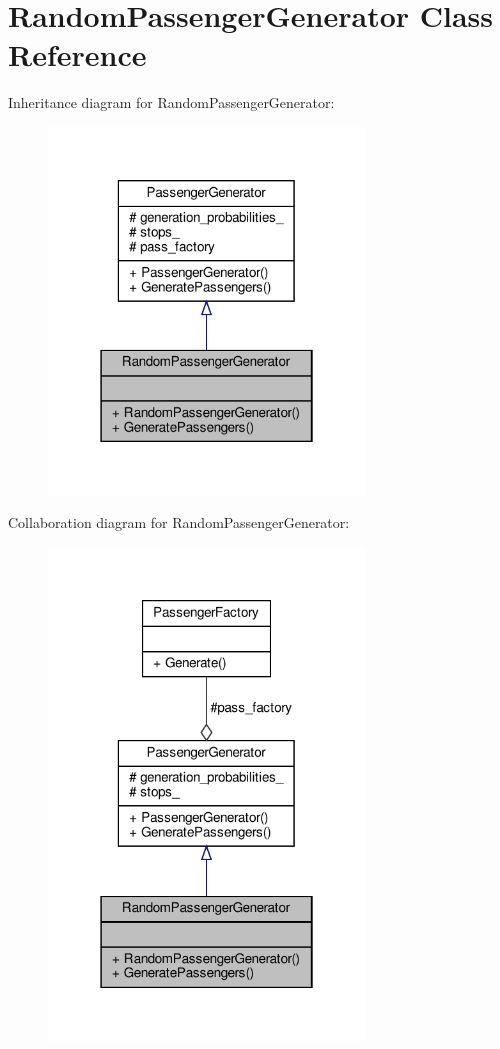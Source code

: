 \hypertarget{classRandomPassengerGenerator}{}\section{Random\+Passenger\+Generator Class Reference}
\label{classRandomPassengerGenerator}


Inheritance diagram for Random\+Passenger\+Generator\+:
\nopagebreak
\begin{figure}[H]
\begin{center}
\leavevmode
\includegraphics[width=238pt]{classRandomPassengerGenerator__inherit__graph}
\end{center}
\end{figure}


Collaboration diagram for Random\+Passenger\+Generator\+:
\nopagebreak
\begin{figure}[H]
\begin{center}
\leavevmode
\includegraphics[width=238pt]{classRandomPassengerGenerator__coll__graph}
\end{center}
\end{figure}
